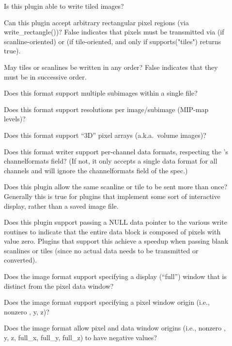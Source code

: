 \begin{description}
\item[\spc] \spc 
\item[\rm {}] Is this plugin able to write tiled images?
\item[\rm {}] Can this plugin accept arbitrary rectangular
  pixel regions (via {\kw write_rectangle()})?  False indicates that
  pixels must be transmitted via \writescanline (if
  scanline-oriented) or \writetile (if tile-oriented, and only if
  {\kw supports("tiles")} returns true).
\item[\rm {}] May tiles or scanlines be written in any
  order?  False indicates that they must be in successive order.
\item[\rm {}] Does this format support multiple subimages
  within a single file?
\item[\rm {}] Does this format support resolutions per
  image/subimage (MIP-map levels)?
\item[\rm {}] Does this format support ``3D'' pixel arrays
  (a.k.a.\ volume images)?
\item[\rm {}] Does this format writer support per-channel
  data formats, respecting the \ImageSpec's {\cf channelformats}
  field?  (If not, it only accepts a single data format for all
  channels and will ignore the {\cf channelformats} field of the spec.)
\item[\rm {}] Does this plugin allow the same scanline or
  tile to be sent more than once?  Generally this is true for plugins
  that implement some sort of interactive display, rather than a saved
  image file.
\item[\rm {}] Does this plugin support passing a NULL data
  pointer to the various {\kw write} routines to indicate that the
  entire data block is composed of pixels with value zero.  Plugins
  that support this achieve a speedup when passing blank scanlines or
  tiles (since no actual data needs to be transmitted or converted).
\item[\rm {}] Does the image format support specifying
  a display (``full'') window that is distinct from the pixel data
  window?
\item[\rm {}] Does the image format support specifying
  a pixel window origin (i.e., nonzero , {\cf y},
  {\cf z})?
\item[\rm {}] Does the image format allow pixel
  and data window origins (i.e., nonzero , {\cf y},
  {\cf z}, {\cf full_x}, {\cf full_y}, {\cf full_z}) to have
  negative values?
\end{description}

